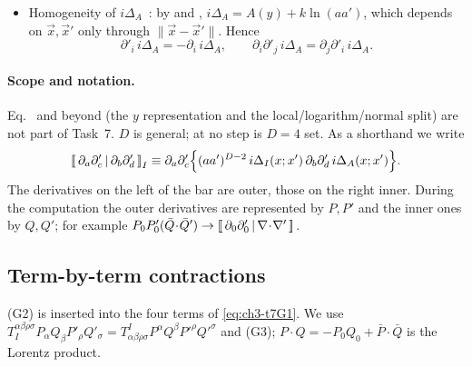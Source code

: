 \begin{itemize}[leftmargin=30pt,labelsep=5pt]
\begin{equation}
\begin{aligned}
&\eta^{\alpha\beta}T^A_{\alpha\beta\mu\nu}=-\tfrac{4}{D-3}\bar\eta_{\mu\nu},\qquad \eta^{\alpha\beta}T^B_{\alpha\beta\mu\nu}=0,\qquad \eta^{\alpha\beta}T^C_{\alpha\beta\mu\nu}=\tfrac{4}{(D-2)(D-3)}f_{\mu\nu},\\
&\eta^{\alpha\beta}\eta^{\rho\sigma}T^{A,B,C}_{\alpha\beta\rho\sigma}=-\tfrac{4(D-1)}{D-3},\ \ 0,\ \ \tfrac{8}{(D-2)(D-3)},
\end{aligned}
\label{eq:ch3-traces}
\end{equation}
where $f_{\mu\nu}\equiv(D-3)u_\mu u_\nu+\bar\eta_{\mu\nu}$.
\item[(G4)] Homogeneity of $i\Delta_A$ \tP\,\tD: by  and , $i\Delta_A=A(y)+k\ln(aa')$, which depends on $\vec x,\vec x'$ only through $\|\vec x-\vec x'\|$. Hence
\begin{equation}
\partial'_i\,i\Delta_A=-\partial_i\,i\Delta_A,\qquad \partial_i\partial'_j\,i\Delta_A=\partial_j\partial'_i\,i\Delta_A .
\label{eq:ch3-hom}
\end{equation}
\end{itemize}

\paragraph{Scope and notation.}
Eq.~ and beyond (the $y$ representation and the local/logarithm/normal split) are not part of Task~7. $D$ is general; at no step is $D=4$ set.
As a shorthand we write
\begin{equation}
\left[\!\left[\,\partial_a\partial'_c\,\middle|\,\partial_b\partial'_d\,\right]\!\right]_{I}\equiv\partial_a\partial'_c\Big\{(aa')^{D-2}\,i\Delta_I(x;x')\,\partial_b\partial'_d\,i\Delta_A(x;x')\Big\}.
\label{eq:ch3-bracket}
\end{equation}
The derivatives on the left of the bar are outer, those on the right inner. During the computation the outer derivatives are represented by $P,P'$ and the
inner ones by $Q,Q'$; for example $P_0P'_0(\bar Q\!\cdot\!\bar Q')\to\left[\!\left[\,\partial_0\partial'_0\,\middle|\,\nabla\!\cdot\!\nabla'\,\right]\!\right]_{}$.

\subsection{Term-by-term contractions \tD}

(G2) is inserted into the four terms of \eqref{eq:ch3-t7G1}. We use $T_I^{\alpha\beta\rho\sigma}P_\alpha Q_\beta P'_\rho Q'_\sigma=T^I_{\alpha\beta\rho\sigma}P^\alpha Q^\beta P'^\rho Q'^\sigma$ and (G3);
$P\!\cdot\!Q=-P_0Q_0+\bar P\!\cdot\!\bar Q$ is the Lorentz product.

